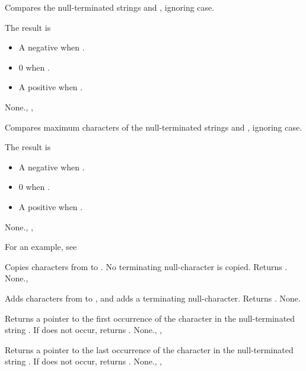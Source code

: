 

{
Compares the null-terminated strings  and , ignoring case.

The result is 
\begin{itemize}
\item A negative  when .
\item 0 when .
\item A positive  when .
\end{itemize}
}
{None.}{, , }



{
Compares maximum  characters of the null-terminated strings  
and , ignoring case.

The result is 
\begin{itemize}
\item A negative  when .
\item 0 when .
\item A positive  when .
\end{itemize}
}
{None.}{, , }

For an example, see 

{
Copies  characters from  to . No
terminating null-character is copied.
Returns .
}
{None.}{, }



{
Adds  characters from  to , and adds a
terminating null-character. Returns .
}
{None.}{}



{
Returns a pointer to the first occurrence of the character  in the
null-terminated string . If  does not occur, returns
.
}
{None.}{, , }



{
Returns a pointer to the last occurrence of the character  in the
null-terminated string . If  does not occur, returns
.
}
{None.}{, , }

